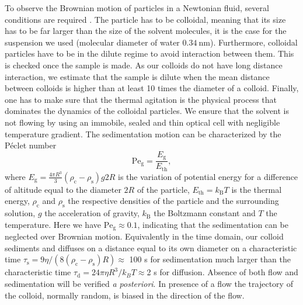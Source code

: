 \documentclass[%
 aip,
 jmp,%
 amsmath,amssymb,
reprint,%
]{revtex4-1}
\newcommand{\tg}[1]{{\color{magenta}#1}} %
\begin{document}
To observe the Brownian motion of particles in a Newtonian fluid, several conditions are required \citep{16_CollSusp}. The particle has to be colloidal, meaning that its size has to be far larger than the size of the solvent molecules, it is the case for the suspension we used \tg{(molecular diameter of water \citep{17_marcus1998properties}  $\SI{0.34}{\nano\meter}$)}. Furthermore, colloidal particles have to be in the dilute regime to avoid interaction between them. This is checked once the sample is made. As our colloids do not have long distance interaction, we estimate that the sample is dilute when the mean distance between colloids is higher than at least 10 times the diameter of a colloid. Finally, one has to make sure that the thermal agitation is the physical process that dominates the dynamics of the colloidal particles. We ensure that the solvent is not flowing by using an immobile, sealed and thin optical cell with negligible temperature gradient. The sedimentation motion can be characterized by the P\'eclet number \citep{12_patankar1980numerical, ajp2009saka}
\begin{equation}
\text{Pe}_\text{g} = \frac{E_\text{g}}{E_\text{th}},
\end{equation}
where $E_\text{g} = \frac{4 \pi R^3}{3}  (\rho_\text{c} - \rho_\text{s}) g  2R$ is the variation of potential energy for a difference of altitude equal to the diameter $2R$ of the particle, $E_\text{th} = k_\text{B} T$ is the thermal energy, $\rho_\text{c}$ and $\rho_\text{s}$ the respective densities of the particle and the surrounding solution, $g$ the acceleration of gravity, $k_\text{B}$ the Boltzmann constant and $T$ the temperature. Here we have $\text{Pe}_\text{g} \approx 0.1$, indicating that the sedimentation can be neglected over Brownian motion. Equivalently in the time domain, our colloid sediments and diffuses on a distance equal to its own diameter on a characteristic time $\tau_\text{s}=9\eta/(8(\rho_\text{c}-\rho_\text{s}) R)\approx$ 100 s for sedimentation much larger than the characteristic time $\tau_\text{d}=24\pi\eta R^3/k_BT\approx$2 s for diffusion. Absence of both flow and sedimentation will be verified \textit{a posteriori}. In presence of a flow the trajectory of the colloid, normally random, is biased in the direction of the flow.
\end{document}
